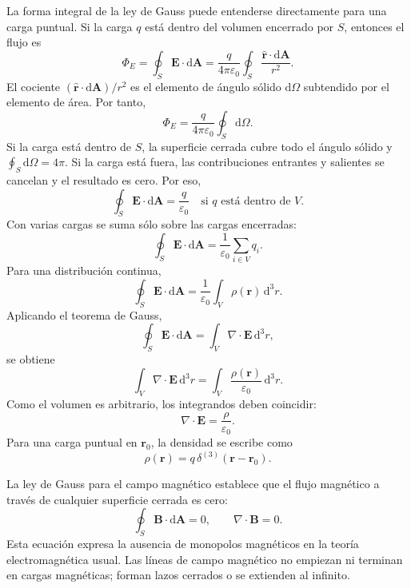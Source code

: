 \documentclass[11pt]{article}
\newcommand{\dd}{\mathrm{d}}
\newcommand{\vb}[1]{\mathbf{#1}}
\begin{document}
La forma integral de la ley de Gauss puede entenderse directamente para una
carga puntual. Si la carga $q$ est\'a dentro del volumen encerrado por $S$,
entonces el flujo es
\begin{equation}
  \Phi_E
  =
  \oint_S \vb E\cdot \dd\vb A
  =
  \frac{q}{4\pi\varepsilon_0}
  \oint_S
  \frac{\hat{\vb r}\cdot \dd\vb A}{r^2}.
\end{equation}
El cociente $(\hat{\vb r}\cdot \dd\vb A)/r^2$ es el elemento de \'angulo
s\'olido $\dd\Omega$ subtendido por el elemento de \'area. Por tanto,
\begin{equation}
  \Phi_E
  =
  \frac{q}{4\pi\varepsilon_0}
  \oint_S \dd\Omega.
\end{equation}
Si la carga est\'a dentro de $S$, la superficie cerrada cubre todo el \'angulo
s\'olido y $\oint_S\dd\Omega=4\pi$. Si la carga est\'a fuera, las
contribuciones entrantes y salientes se cancelan y el resultado es cero.
Por eso,
\begin{equation}
  \oint_S \vb E\cdot \dd\vb A
  =
  \frac{q}{\varepsilon_0}
  \quad\text{si }q\text{ est\'a dentro de }V.
\end{equation}
Con varias cargas se suma s\'olo sobre las cargas encerradas:
\begin{equation}
  \oint_S \vb E\cdot \dd\vb A
  =
  \frac{1}{\varepsilon_0}
  \sum_{i\in V}q_i.
\end{equation}
Para una distribuci\'on continua,
\begin{equation}
  \oint_S \vb E\cdot \dd\vb A
  =
  \frac{1}{\varepsilon_0}
  \int_V \rho(\vb r)\,\dd^3r.
\end{equation}
Aplicando el teorema de Gauss,
\begin{equation}
  \oint_S \vb E\cdot \dd\vb A
  =
  \int_V \nabla\cdot\vb E\,\dd^3r,
\end{equation}
se obtiene
\begin{equation}
  \int_V \nabla\cdot\vb E\,\dd^3r
  =
  \int_V \frac{\rho(\vb r)}{\varepsilon_0}\,\dd^3r.
\end{equation}
Como el volumen es arbitrario, los integrandos deben coincidir:
\begin{equation}
  \boxed{\nabla\cdot\vb E=\frac{\rho}{\varepsilon_0}.}
\end{equation}
Para una carga puntual en $\vb r_0$, la densidad se escribe como
\begin{equation}
  \rho(\vb r)=q\,\delta^{(3)}(\vb r-\vb r_0).
\end{equation}

La ley de Gauss para el campo magn\'etico establece que el flujo magn\'etico a
trav\'es de cualquier superficie cerrada es cero:
\begin{equation}
  \oint_S \vb B\cdot \dd\vb A=0,
  \qquad
  \boxed{\nabla\cdot\vb B=0.}
\end{equation}
Esta ecuaci\'on expresa la ausencia de monopolos magn\'eticos en la teor\'ia
electromagn\'etica usual. Las l\'ineas de campo magn\'etico no empiezan ni
terminan en cargas magn\'eticas; forman lazos cerrados o se extienden al
infinito.
\end{document}
